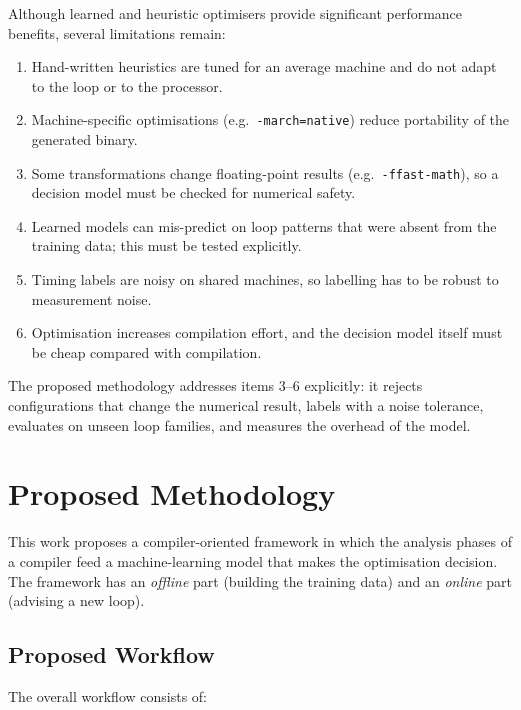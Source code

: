 \documentclass[12pt,a4paper]{article}
\begin{document}
Although learned and heuristic optimisers provide significant performance
benefits, several limitations remain:

\begin{enumerate}
    \item Hand-written heuristics are tuned for an average machine and do not
    adapt to the loop or to the processor.
    \item Machine-specific optimisations (e.g.\ \texttt{-march=native}) reduce
    portability of the generated binary.
    \item Some transformations change floating-point results
    (e.g.\ \texttt{-ffast-math}), so a decision model must be checked for
    numerical safety.
    \item Learned models can mis-predict on loop patterns that were absent from
    the training data; this must be tested explicitly.
    \item Timing labels are noisy on shared machines, so labelling has to be
    robust to measurement noise.
    \item Optimisation increases compilation effort, and the decision model
    itself must be cheap compared with compilation.
\end{enumerate}

The proposed methodology addresses items 3--6 explicitly: it rejects
configurations that change the numerical result, labels with a noise
tolerance, evaluates on unseen loop families, and measures the overhead of
the model.

\newpage

\section{Proposed Methodology}
\label{sec:method}

This work proposes a compiler-oriented framework in which the analysis phases
of a compiler feed a machine-learning model that makes the optimisation
decision. The framework has an \emph{offline} part (building the training
data) and an \emph{online} part (advising a new loop).

\subsection{Proposed Workflow}

The overall workflow consists of:
\end{document}
